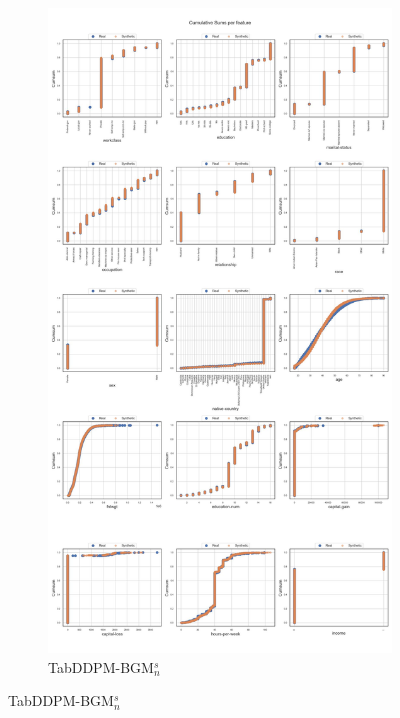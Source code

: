 \newpage
\begin{landscape}
	\begin{figure}[h]
		\centering
		\hfill
		\begin{subfigure}{0.3\linewidth}
			\includegraphics[height=\textheight,width=\linewidth,keepaspectratio]{images/cumsums/tab-ddpm-bgm-simTune-none.jpg}
			\caption{TabDDPM-BGM$^{s}_n$}
		\end{subfigure}

\end{figure}
\end{landscape}

